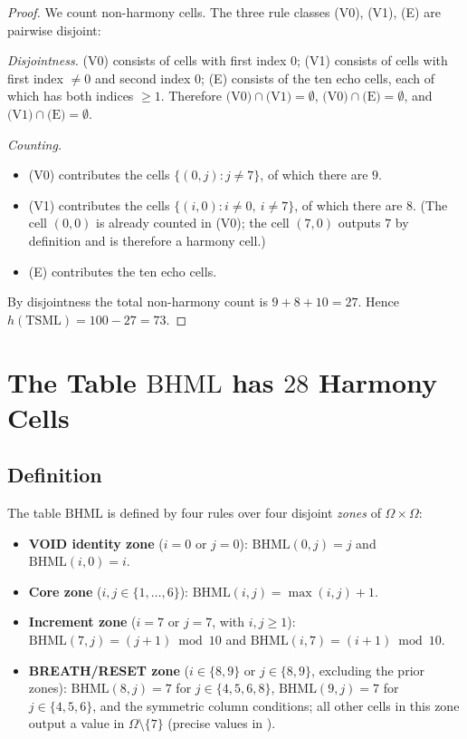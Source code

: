 \documentclass[11pt,reqno]{amsart}
\theoremstyle{plain}
\theoremstyle{definition}
\theoremstyle{remark}
\newcommand{\TSML}{\mathrm{TSML}}
\newcommand{\BHML}{\mathrm{BHML}}
\begin{document}
\begin{proof}
We count non-harmony cells. The three rule classes (V0), (V1), (E)
are pairwise disjoint:

\emph{Disjointness.} (V0) consists of cells with first index $0$;
(V1) consists of cells with first index $\ne 0$ and second index
$0$; (E) consists of the ten echo cells, each of which has both
indices $\ge 1$. Therefore $\text{(V0)} \cap \text{(V1)} =
\emptyset$, $\text{(V0)} \cap \text{(E)} = \emptyset$, and
$\text{(V1)} \cap \text{(E)} = \emptyset$.

\emph{Counting.}
\begin{itemize}
\item (V0) contributes the cells $\{(0, j) : j \ne 7\}$, of which
there are $9$.
\item (V1) contributes the cells $\{(i, 0) : i \ne 0,\ i \ne 7\}$,
of which there are $8$. (The cell $(0, 0)$ is already counted in
(V0); the cell $(7, 0)$ outputs $7$ by definition and is therefore
a harmony cell.)
\item (E) contributes the ten echo cells.
\end{itemize}

By disjointness the total non-harmony count is
$9 + 8 + 10 = 27$. Hence $h(\TSML) = 100 - 27 = 73$.
\end{proof}

\section{The Table $\BHML$ has $28$ Harmony Cells}\label{sec:bhml}

\subsection{Definition}

The table $\BHML$ is defined by four rules over four disjoint
\emph{zones} of $\Omega \times \Omega$:

\begin{itemize}
\item[(R$_A$)] \textbf{VOID identity zone} ($i = 0$ or $j = 0$):
$\BHML(0, j) = j$ and $\BHML(i, 0) = i$.
\item[(R$_B$)] \textbf{Core zone} ($i, j \in \{1, \ldots, 6\}$):
$\BHML(i, j) = \max(i, j) + 1$.
\item[(R$_7$)] \textbf{Increment zone} ($i = 7$ or $j = 7$, with
$i, j \ge 1$): $\BHML(7, j) = (j + 1) \bmod 10$ and
$\BHML(i, 7) = (i + 1) \bmod 10$.
\item[(R$_{89}$)] \textbf{BREATH/RESET zone} ($i \in \{8, 9\}$ or
$j \in \{8, 9\}$, excluding the prior zones): $\BHML(8, j) = 7$
for $j \in \{4, 5, 6, 8\}$, $\BHML(9, j) = 7$ for
$j \in \{4, 5, 6\}$, and the symmetric column conditions; all other
cells in this zone output a value in $\Omega \setminus \{7\}$
(precise values in \cite{ck_tables}).
\end{itemize}
\end{document}
